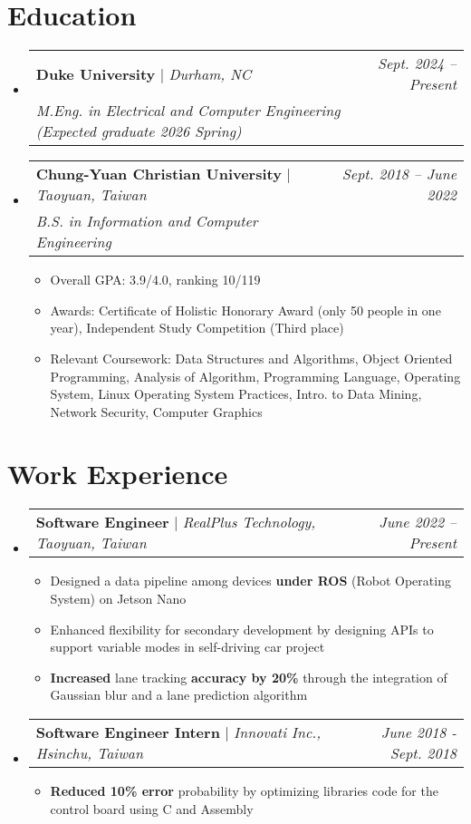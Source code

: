 \documentclass[letterpaper,11pt]{article}
\makeatletter
\newcommand{\HL}[1]{
  \textbf{\textcolor{DukeBlue}{#1}}
}
\newcommand{\subheadingtitlevspace}{
\vspace{-3pt}
}
\newcommand{\resumeItem}[1]{
  \item{
    {#1 \vspace{-4pt}}
  }
}
\newcommand{\titleItem}[1]{
  \textbf{#1}
}
\newcommand{\resumeSubheading}[4]{
   \item
     \begin{tabular*}{0.97\textwidth}[t]{l@{\extracolsep{\fill}}r}
       \textbf{#1} | \emph{#2} & \textit{#4}\\
       \textit{#3} \\
     \end{tabular*}\vspace{-8pt}
 }
\newcommand{\resumeProjectHeading}[2]{
    \item
    \begin{tabular*}{0.97\textwidth}{l@{\extracolsep{\fill}}r}
      #1 & \textit{ #2} \\
    \end{tabular*}\vspace{-9pt}
}
\newcommand{\resumeSubHeadingListStart}{\subheadingtitlevspace\begin{itemize}[leftmargin=0.15in, label={}]}
\newcommand{\resumeSubHeadingListEnd}{\end{itemize}}
\newcommand{\resumeItemListStart}{
\begin{itemize}}
\newcommand{\resumeItemListEnd}{
\end{itemize}\vspace{-8pt}}
\makeatother
\begin{document}
\section{Education}
  \resumeSubHeadingListStart
    \resumeSubheading
      {Duke University} {Durham, NC}
      {M.Eng. in Electrical and Computer Engineering {(Expected graduate 2026 Spring)}} 
      {Sept. 2024 -- Present}
    \resumeSubheading
      {Chung-Yuan Christian University} {Taoyuan, Taiwan}
      {B.S. in Information and Computer Engineering} 
      {Sept. 2018 -- June 2022}
    \resumeItemListStart
      \resumeItem{Overall GPA: 3.9/4.0, ranking 10/119}
      \resumeItem{Awards: Certificate of Holistic Honorary Award (only 50 people in one year), Independent Study Competition (Third place)}
    \resumeItem{Relevant Coursework: Data Structures and Algorithms, Object Oriented Programming, Analysis of Algorithm, Programming Language, Operating System, Linux Operating System Practices, Intro. to Data Mining, Network Security, Computer Graphics} 
    \resumeItemListEnd
  \resumeSubHeadingListEnd
\vspace{-8pt}

   

\section{Work Experience}
  \resumeSubHeadingListStart
      \resumeProjectHeading
        {\titleItem{{Software Engineer}} $|$ \emph{RealPlus Technology, Taoyuan, Taiwan}}{June 2022 -- Present}
      \resumeItemListStart
        \resumeItem{Designed a data pipeline among devices \HL{under ROS} (Robot Operating System) on Jetson Nano }
        \resumeItem{Enhanced flexibility for secondary development by designing APIs to support variable modes in self-driving car project }
        \resumeItem{\HL{Increased} lane tracking \HL{accuracy by 20\%} through the integration of Gaussian blur and a lane prediction algorithm}
      \resumeItemListEnd


    \resumeProjectHeading
        {\titleItem{{Software Engineer Intern}} $|$ \emph{Innovati Inc., Hsinchu, Taiwan}}{June 2018 - Sept. 2018}
      \resumeItemListStart
        \resumeItem{\HL{Reduced 10\% error} probability by optimizing libraries code for the control board using C and Assembly}
      \resumeItemListEnd
  \resumeSubHeadingListEnd

\end{document}
